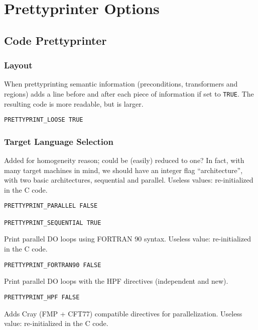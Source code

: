\section{Prettyprinter Options}
\label{section-prettyprinters}

\subsection{Code Prettyprinter}

\subsubsection{Layout}

When prettyprinting semantic information (preconditions, transformers and
regions) adds a line before and after each piece of information if set to
\verb+TRUE+. The resulting code is more readable, but is larger.  

\begin{verbatim}
PRETTYPRINT_LOOSE TRUE 
\end{verbatim}

\subsubsection{Target Language Selection}

Added for homogeneity reason; could be (easily) reduced to one?  In
fact, with many target machines in mind, we should have an integer flag
``architecture'', with two basic architectures, sequential and parallel.
Useless values: re-initialized in the C code.

\begin{verbatim}
PRETTYPRINT_PARALLEL FALSE

PRETTYPRINT_SEQUENTIAL TRUE
\end{verbatim}

Print parallel DO loops using FORTRAN 90 syntax. Useless value:
re-initialized in the C code.

\begin{verbatim}
PRETTYPRINT_FORTRAN90 FALSE
\end{verbatim}

Print parallel DO loops with the HPF directives (independent and new).
\begin{verbatim}
PRETTYPRINT_HPF FALSE
\end{verbatim}

Adds Cray (FMP + CFT77) compatible directives for parallelization.
Useless value: re-initialized in the C code.

